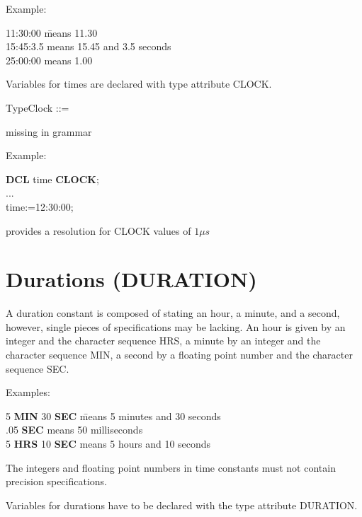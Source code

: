 Example:

\begin{tabbing}
11:30:00 \x \= means 11.30\\
15:45:3.5   \> means 15.45 and 3.5 seconds\\
25:00:00    \> means 1.00
\end{tabbing}

Variables for times are declared with type attribute CLOCK.

\begin{front}
TypeClock ::=\\
\end{front}
\begin{grammar}
missing in grammar
\end{grammar}

Example:

{\bf DCL} time {\bf CLOCK};\\
...\\
time:=12:30:00;

\begin{added}
\OpenPEARL{} provides a resolution for CLOCK values of $1\mu s$
\end{added}

\section{Durations (DURATION)}   %
\label{sec_type_duration}

A duration constant is composed of stating an hour, a minute, and a
second, however, single pieces of specifications may be lacking. An hour
is given by an integer and the character sequence HRS, a minute by an
integer and the character sequence MIN, a second by a floating point
number and the character sequence SEC.

Examples:

\begin{tabbing}
5 {\bf MIN} 30 {\bf SEC} \= means 5 minutes and 30 seconds \\
.05 {\bf SEC}            \> means 50 milliseconds \\
5 {\bf HRS} 10 {\bf SEC} \> means 5 hours and 10 seconds
\end{tabbing}

The integers and floating point numbers in time constants must not
contain precision specifications.

Variables for durations have to be declared with the type attribute
DURATION.

